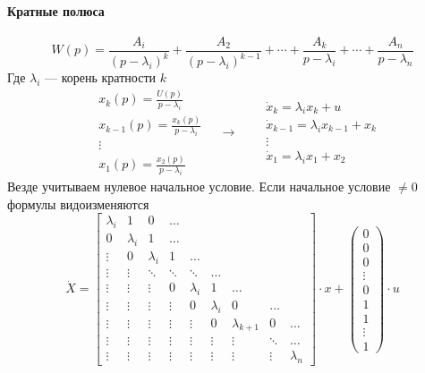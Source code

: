 \paragraph{Кратные полюса}
\[
  W(p) = \frac{A_i}{(p - \lambda_i)^{k}} + \frac{A_2}{(p-\lambda_i)^{k-1}} +
  \cdots + \frac{A_k}{p-\lambda_i} + \cdots + \frac{A_n}{p - \lambda_n}
\] 
Где $\lambda_i$ --- корень кратности $k$
\[
  \begin{aligned}
    &x_k(p) = \frac{U(p)}{p - \lambda_i}\\
    &x_{k-1}(p) = \frac{x_k(p)}{p-\lambda_i}\\
    &\vdots\\
    & x_1(p) = \frac{x_2(p)}{p-\lambda_i}
  \end{aligned} \quad \to \quad
  \begin{aligned}
    & \dot x_k = \lambda_i x_k + u \\
    & \dot x_{k-1} = \lambda_i x_{k-1} + x_k\\
    & \vdots\\
    & \dot x_1 = \lambda_i x_1 + x_2
  \end{aligned}
\] 
Везде учитываем нулевое начальное условие. Если начальное условие $\neq 0$
формулы видоизменяются
\[
  \dot X = \begin{bmatrix} \lambda_i & 1 & 0 & \hdots \\
			0 & \lambda_i & 1 & \hdots \\
			\vdots & 0 & \lambda_i & 1 & \hdots\\
			\vdots & \vdots & \ddots & \ddots & \ddots &\hdots\\
			\vdots & \vdots & \vdots & 0 & \lambda_i & 1 & \hdots\\
			\vdots & \vdots & \vdots & \vdots & 0 & \lambda_i & 0 & \hdots\\
			\vdots & \vdots & \vdots & \vdots & \vdots & 0 & \lambda_{k+1} & 0
						 &\hdots\\
			\vdots & \vdots & \vdots & \vdots & \vdots & \vdots & \vdots & \ddots
						 &\hdots\\
			\vdots & \vdots & \vdots & \vdots & \vdots & \vdots & \vdots & \vdots &
			\lambda_n
			\end{bmatrix} \cdot x + \begin{pmatrix} 0 \\ 0 \\ 0 \\ \vdots\\ 0\\ 1\\
			1\\ \vdots \\ 1
		\end{pmatrix} \cdot u
\]
